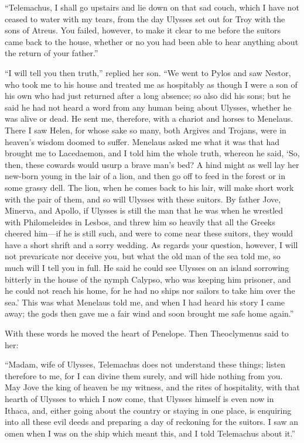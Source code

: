 “Telemachus, I shall go upstairs and lie down on that sad couch, which I have
not ceased to water with my tears, from the day Ulysses set out for Troy with
the sons of Atreus. You failed, however, to make it clear to me before the
suitors came back to the house, whether or no you had been able to hear
anything about the return of your father.”

“I will tell you then truth,” replied her son. “We went to Pylos and saw
Nestor, who took me to his house and treated me as hospitably as though I were
a son of his own who had just returned after a long absence; so also did his
sons; but he said he had not heard a word from any human being about Ulysses,
whether he was alive or dead. He sent me, therefore, with a chariot and horses
to Menelaus. There I saw Helen, for whose sake so many, both Argives and
Trojans, were in heaven’s wisdom doomed to suffer. Menelaus asked me what it
was that had brought me to Lacedaemon, and I told him the whole truth, whereon
he said, ‘So, then, these cowards would usurp a brave man’s bed? A hind might
as well lay her new-born young in the lair of a lion, and then go off to feed
in the forest or in some grassy dell. The lion, when he comes back to his lair,
will make short work with the pair of them, and so will Ulysses with these
suitors. By father Jove, Minerva, and Apollo, if Ulysses is still the man that
he was when he wrestled with Philomeleides in Lesbos, and threw him so heavily
that all the Greeks cheered him—if he is still such, and were to come near
these suitors, they would have a short shrift and a sorry wedding. As regards
your question, however, I will not prevaricate nor deceive you, but what the
old man of the sea told me, so much will I tell you in full. He said he could
see Ulysses on an island sorrowing bitterly in the house of the nymph Calypso,
who was keeping him prisoner, and he could not reach his home, for he had no
ships nor sailors to take him over the sea.’ This was what Menelaus told me,
and when I had heard his story I came away; the gods then gave me a fair wind
and soon brought me safe home again.”

With these words he moved the heart of Penelope. Then Theoclymenus said to her:

“Madam, wife of Ulysses, Telemachus does not understand these things; listen
therefore to me, for I can divine them surely, and will hide nothing from you.
May Jove the king of heaven be my witness, and the rites of hospitality, with
that hearth of Ulysses to which I now come, that Ulysses himself is even now in
Ithaca, and, either going about the country or staying in one place, is
enquiring into all these evil deeds and preparing a day of reckoning for the
suitors. I saw an omen when I was on the ship which meant this, and I told
Telemachus about it.”

